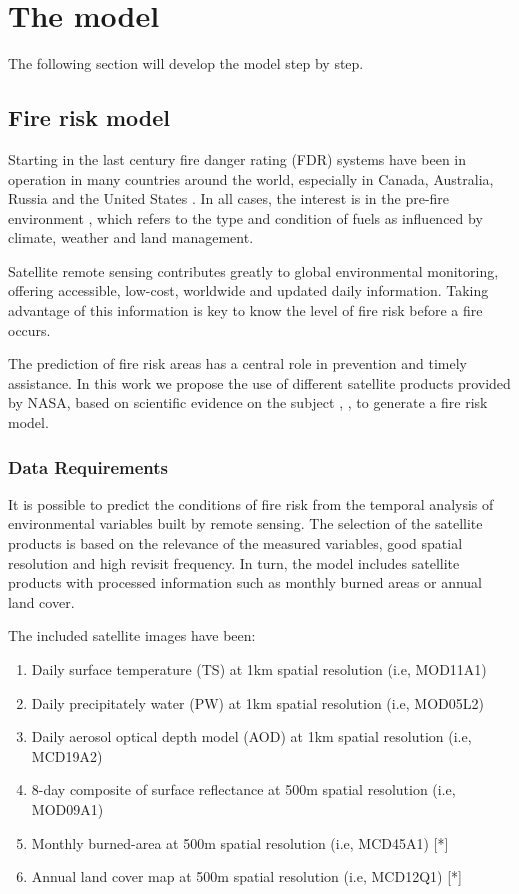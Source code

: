 \documentclass{article}
\begin{document}
\section{The model}

The following section will develop the model step by step.

\subsection{Fire risk model}

Starting in the last century fire danger rating (FDR) systems have been in operation in many countries around the world, especially in Canada, Australia, Russia and the United States \cite{chowdhury2015operational}. In all cases, the interest is in the pre-fire environment  \cite{jain2004}, which refers to the type and condition of fuels as influenced by climate, weather and land management.

Satellite remote sensing contributes greatly to global environmental monitoring, offering accessible, low-cost, worldwide and updated daily information. Taking advantage of this information is key to know the level of fire risk before a fire occurs.

The prediction of fire risk areas has a central role in prevention and timely assistance. In this work we propose the use of different satellite products provided by NASA, based on scientific evidence on the subject \cite{chowdhury2015operational}, \cite{chowdhury2013use}, to generate a fire risk model.

\subsubsection{Data Requirements}

It is possible to predict the conditions of fire risk from the temporal analysis of environmental variables built by remote sensing. The selection of the satellite products is based on the relevance of the measured variables, good spatial resolution and high revisit frequency. In turn, the model includes satellite products with processed information such as monthly burned areas or annual land cover.

The included satellite images have been:

\begin{enumerate}
    \item Daily surface temperature (TS) at 1km spatial resolution (i.e, MOD11A1) 
    \item Daily precipitately water (PW) at 1km spatial resolution (i.e, MOD05L2) 
    \item Daily aerosol optical depth model (AOD) at 1km spatial resolution (i.e, MCD19A2) 
    \item 8-day composite of surface reflectance at 500m spatial resolution (i.e, MOD09A1) 
    \item Monthly burned-area at 500m spatial resolution (i.e, MCD45A1) [*]
    \item Annual land cover map at 500m spatial resolution (i.e, MCD12Q1) [*]
\end{enumerate}
\end{document}
